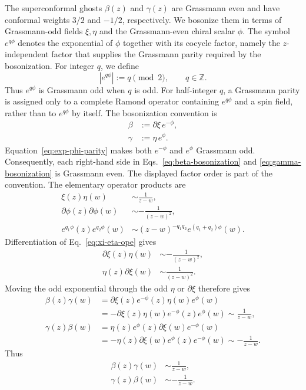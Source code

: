 \documentclass[12pt]{article}
\numberwithin{equation}{section}
\begin{document}
The superconformal ghosts $\beta(z)$ and $\gamma(z)$ are Grassmann even and
have conformal weights $3/2$ and $-1/2$, respectively.  We bosonize them in
terms of Grassmann-odd fields $\xi,\eta$ and the Grassmann-even chiral scalar
$\phi$.  The symbol $e^{q\phi}$ denotes the exponential of $\phi$ together
with its cocycle factor, namely the $z$-independent factor that supplies the
Grassmann parity required by the bosonization.  For integer $q$, we define
\begin{equation}
\left|e^{q\phi}\right|:=q\pmod 2,
\qquad q\in\mathbb Z.
\label{eq:exp-phi-parity}
\end{equation}
Thus $e^{q\phi}$ is Grassmann odd when $q$ is odd.  For half-integer $q$, a
Grassmann parity is assigned only to a complete Ramond operator containing
$e^{q\phi}$ and a spin field, rather than to $e^{q\phi}$ by itself.  The
bosonization convention is
\begin{align}
\beta
&:=\partial\xi\,e^{-\phi},
\label{eq:beta-bosonization}
\\
\gamma
&:=\eta\,e^{\phi}.
\label{eq:gamma-bosonization}
\end{align}
Equation~\eqref{eq:exp-phi-parity} makes both $e^{-\phi}$ and $e^\phi$
Grassmann odd.  Consequently, each
right-hand side in Eqs.~\eqref{eq:beta-bosonization} and
\eqref{eq:gamma-bosonization} is Grassmann even.  The displayed factor order
is part of the convention.  The elementary operator products are
\begin{align}
\xi(z)\eta(w)
&\sim\frac{1}{z-w},
\label{eq:xi-eta-ope}
\\
\partial\phi(z)\partial\phi(w)
&\sim-\frac{1}{(z-w)^2},
\label{eq:dphi-dphi-ope}
\\
e^{q_1\phi}(z)e^{q_2\phi}(w)
&\sim(z-w)^{-q_1q_2}e^{(q_1+q_2)\phi}(w).
\label{eq:exp-phi-ope}
\end{align}
Differentiation of Eq.~\eqref{eq:xi-eta-ope} gives
\begin{align*}
\partial\xi(z)\eta(w)
&\sim-\frac{1}{(z-w)^2},
\\
\eta(z)\partial\xi(w)
&\sim\frac{1}{(z-w)^2}.
\end{align*}
Moving the odd exponential through the odd $\eta$ or $\partial\xi$ therefore
gives
\begin{align*}
\beta(z)\gamma(w)
&=\partial\xi(z)e^{-\phi}(z)\eta(w)e^\phi(w)
\\
&=-\partial\xi(z)\eta(w)e^{-\phi}(z)e^\phi(w)
\sim\frac{1}{z-w},
\\
\gamma(z)\beta(w)
&=\eta(z)e^\phi(z)\partial\xi(w)e^{-\phi}(w)
\\
&=-\eta(z)\partial\xi(w)e^\phi(z)e^{-\phi}(w)
\sim-\frac{1}{z-w}.
\end{align*}
Thus
\begin{equation}
\begin{aligned}
\beta(z)\gamma(w)
&\sim\frac{1}{z-w},
\\
\gamma(z)\beta(w)
&\sim-\frac{1}{z-w}.
\end{aligned}
\label{eq:beta-gamma-ope}
\end{equation}
\end{document}
